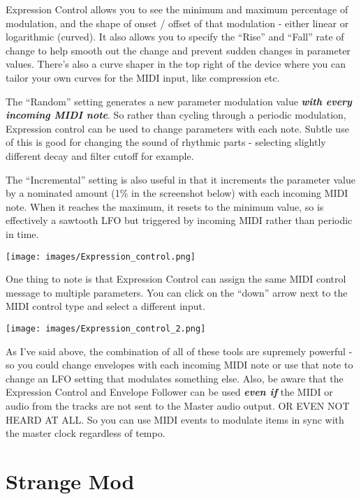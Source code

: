 \documentclass[
  12pt,
  letterpaper,
  oneside,
  open=any]{scrbook}
\begin{document}
Expression Control allows you to see the minimum and maximum percentage
of modulation, and the shape of onset / offset of that modulation -
either linear or logarithmic (curved). It also allows you to specify the
``Rise'' and ``Fall'' rate of change to help smooth out the change and
prevent sudden changes in parameter values. There's also a curve shaper
in the top right of the device where you can tailor your own curves for
the MIDI input, like compression etc.

The ``Random'' setting generates a new parameter modulation value
\textbf{\emph{with every incoming MIDI note}}. So rather than cycling
through a periodic modulation, Expression control can be used to change
parameters with each note. Subtle use of this is good for changing the
sound of rhythmic parts - selecting slightly different decay and filter
cutoff for example.

The ``Incremental'' setting is also useful in that it increments the
parameter value by a nominated amount (1\% in the screenshot below) with
each incoming MIDI note. When it reaches the maximum, it resets to the
minimum value, so is effectively a sawtooth LFO but triggered by
incoming MIDI rather than periodic in time.

\texttt{[image: images/Expression\_control.png]}

One thing to note is that Expression Control can assign the same MIDI
control message to multiple parameters. You can click on the ``down''
arrow next to the MIDI control type and select a different input.

\texttt{[image: images/Expression\_control\_2.png]}

As I've said above, the combination of all of these tools are supremely
powerful - so you could change envelopes with each incoming MIDI note or
use that note to change an LFO setting that modulates something else.
Also, be aware that the Expression Control and Envelope Follower can be
used \textbf{\emph{even if}} the MIDI or audio from the tracks are not
sent to the Master audio output. OR EVEN NOT HEARD AT ALL. So you can
use MIDI events to modulate items in sync with the master clock
regardless of tempo.

\section{Strange Mod}\label{strange-mod}
\end{document}
